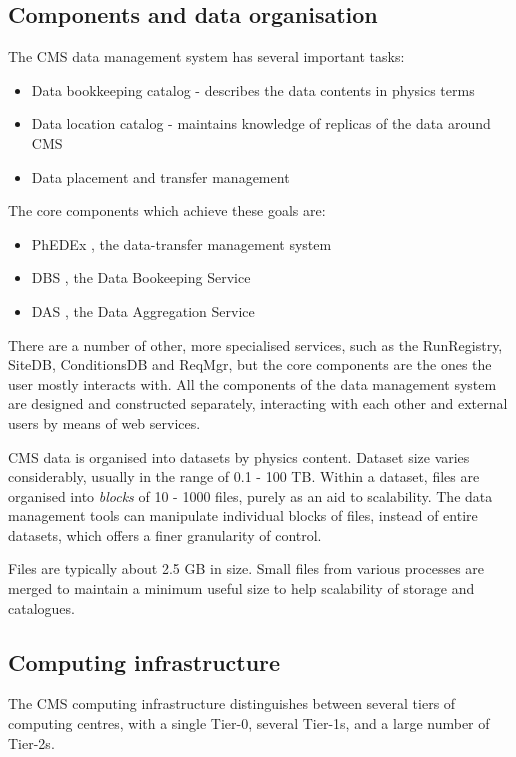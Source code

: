\subsection{Components and data organisation}
The CMS data management system has several important tasks:
\begin{itemize}
  \item Data bookkeeping catalog - describes the data contents in physics terms
  \item Data location catalog - maintains knowledge of replicas of the data around CMS
  \item Data placement and transfer management
\end{itemize}

The core components which achieve these goals are:
\begin{itemize}
  \item PhEDEx \cite{PhEDEx}, the data-transfer management system
  \item DBS \cite{DBS}, the Data Bookeeping Service
  \item DAS \cite{DAS}, the Data Aggregation Service
\end{itemize}

There are a number of other, more specialised services, such as the RunRegistry, SiteDB, 
ConditionsDB and ReqMgr, but the core components are the ones the user mostly interacts with. All 
the components of the data management system are designed and constructed separately, interacting 
with each other and external users by means of web services.

CMS data is organised into datasets by physics content. Dataset size varies considerably, usually 
in the range of 0.1 - 100 TB. Within a dataset, files are organised into {\it blocks} of 10 - 1000 
files, purely as an aid to scalability. The data management tools can manipulate individual blocks 
of files, instead of entire datasets, which offers a finer granularity of control.

Files are typically about 2.5 GB in size. Small files from various processes are merged to 
maintain a minimum useful size to help scalability of storage and catalogues.

\subsection{Computing infrastructure}
The CMS computing infrastructure distinguishes between several tiers of computing centres, with a
single Tier-0, several Tier-1s, and a large number of Tier-2s.

